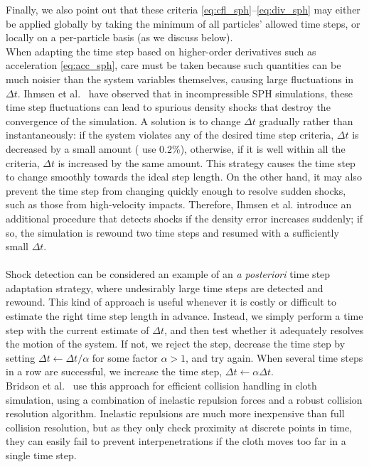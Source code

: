 Finally, we also point out that these criteria \eqref{eq:cfl_sph}--\eqref{eq:div_sph} may either be applied globally by taking the minimum of all particles' allowed time steps, or locally on a per-particle basis (as we discuss below).
\\
When adapting the time step based on higher-order derivatives such as acceleration \eqref{eq:acc_sph}, care must be taken because such quantities can be much noisier than the system variables themselves, causing large fluctuations in $\Delta t$.
Ihmsen et al.~\cite{Ihmsen2010} have observed that in incompressible SPH simulations, these time step fluctuations can lead to spurious density shocks that destroy the convergence of the simulation.
A solution is to change $\Delta t$ gradually rather than instantaneously: if the system violates any of the desired time step criteria, $\Delta t$ is decreased by a small amount (\cite{Ihmsen2010} use $0.2\%$), otherwise, if it is well within all the criteria, $\Delta t$ is increased by the same amount.
This strategy causes the time step to change smoothly towards the ideal step length.
On the other hand, it may also prevent the time step from changing quickly enough to resolve sudden shocks, such as those from high-velocity impacts.
Therefore, Ihmsen et al. introduce an additional procedure that detects shocks if the density error increases suddenly; if so, the simulation is rewound two time steps and resumed with a sufficiently small $\Delta t$.
\\ \\
Shock detection can be considered an example of an \textit{a posteriori} time step adaptation strategy, where undesirably large time steps are detected and rewound.
This kind of approach is useful whenever it is costly or difficult to estimate the right time step length in advance.
Instead, we simply perform a time step with the current estimate of $\Delta t$, and then test whether it adequately resolves the motion of the system.
If not, we reject the step, decrease the time step by setting $\Delta t\gets\Delta t/\alpha$ for some factor $\alpha>1$, and try again.
When several time steps in a row are successful, we increase the time step, $\Delta t\gets\alpha\Delta t$.
\\
Bridson et al.~\cite{Bridson2002} use this approach for efficient collision handling in cloth simulation, using a combination of inelastic repulsion forces and a robust collision resolution algorithm.
Inelastic repulsions are much more inexpensive than full collision resolution, but as they only check proximity at discrete points in time, they can easily fail to prevent interpenetrations if the cloth moves too far in a single time step.

